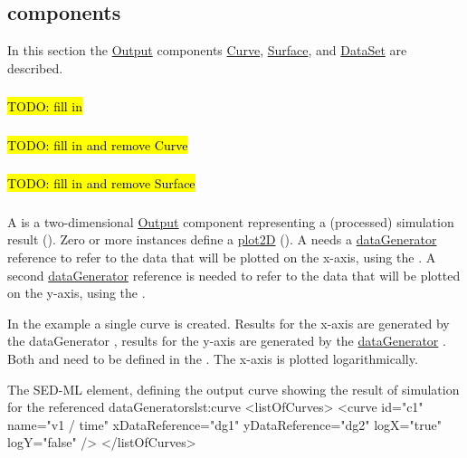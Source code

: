 \subsection{ components}
In this section the \hyperref[class:output]{Output} components \hyperref[class:curve]{Curve}, \hyperref[class:surface]{Surface}, and \hyperref[class:dataSet]{DataSet} are described.


\subsubsection{}
\label{class:axis}
\hl{TODO: fill in}

\subsubsection{}
\label{class:axis}
\hl{TODO: fill in and remove Curve}

\subsubsection{}
\label{class:axis}
\hl{TODO: fill in and remove Surface}

\subsubsection{}
\label{class:curve}
A  is a two-dimensional \hyperref[class:output]{Output} component representing a (processed) simulation result (). Zero or more  instances define a \hyperref[class:plot2D]{plot2D} (). A  needs a \hyperref[class:dataGenerator]{dataGenerator} reference to refer to the data that will be plotted on the x-axis, using the \hyperref[sec:xDataReference]{}. A second \hyperref[class:dataGenerator]{dataGenerator} reference is needed to refer to the data that will be plotted on the y-axis, using the \hyperref[sec:yDataReference]{}. 

In the example a single curve is created. Results for the x-axis are generated by the dataGenerator , results for the y-axis are generated by the \hyperref[class:dataGenerator]{dataGenerator} . Both  and  need to be defined in the \hyperref[sec:listOfDataGenerators]{}. The x-axis is plotted logarithmically.
\begin{myXmlLst}{The SED-ML  element, defining the output curve showing the result of simulation for the referenced dataGenerators}{lst:curve}
<listOfCurves>
	<curve id="c1" name="v1 / time" xDataReference="dg1" yDataReference="dg2" logX="true" logY="false" />
</listOfCurves>
\end{myXmlLst}

